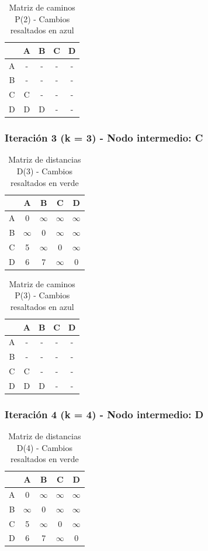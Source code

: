 \documentclass[12pt]{article}
\begin{document}
\begin{table}[h!]
\centering
\begin{tabular}{|c|c|c|c|c|}
\hline
 & A & B & C & D \\\hline
A & - & - & - & - \\\hline
B & - & - & - & - \\\hline
C & C & - & - & - \\\hline
D & D & D & - & - \\\hline
\end{tabular}
\caption{Matriz de caminos P(2) - Cambios resaltados en azul}
\end{table}

\subsubsection{Iteración 3 (k = 3) - Nodo intermedio: C}
\begin{table}[h!]
\centering
\begin{tabular}{|c|c|c|c|c|}
\hline
 & A & B & C & D \\\hline
A & 0 & $\infty$ & $\infty$ & $\infty$ \\\hline
B & $\infty$ & 0 & $\infty$ & $\infty$ \\\hline
C & 5 & $\infty$ & 0 & $\infty$ \\\hline
D & 6 & 7 & $\infty$ & 0 \\\hline
\end{tabular}
\caption{Matriz de distancias D(3) - Cambios resaltados en verde}
\end{table}

\begin{table}[h!]
\centering
\begin{tabular}{|c|c|c|c|c|}
\hline
 & A & B & C & D \\\hline
A & - & - & - & - \\\hline
B & - & - & - & - \\\hline
C & C & - & - & - \\\hline
D & D & D & - & - \\\hline
\end{tabular}
\caption{Matriz de caminos P(3) - Cambios resaltados en azul}
\end{table}

\subsubsection{Iteración 4 (k = 4) - Nodo intermedio: D}
\begin{table}[h!]
\centering
\begin{tabular}{|c|c|c|c|c|}
\hline
 & A & B & C & D \\\hline
A & 0 & $\infty$ & $\infty$ & $\infty$ \\\hline
B & $\infty$ & 0 & $\infty$ & $\infty$ \\\hline
C & 5 & $\infty$ & 0 & $\infty$ \\\hline
D & 6 & 7 & $\infty$ & 0 \\\hline
\end{tabular}
\caption{Matriz de distancias D(4) - Cambios resaltados en verde}
\end{table}
\end{document}
